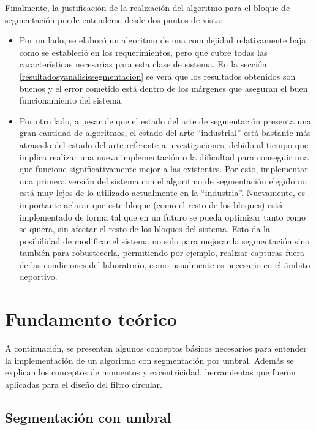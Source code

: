Finalmente, la justificación de la realización del algoritmo para el bloque de segmentación puede entenderse desde dos puntos de vista: 
\begin{itemize}
 \item Por un lado, se elaboró un algoritmo de una complejidad relativamente baja como se estableció en los requerimientos, pero que cubre todas las características necesarias para esta clase de sistema. En la sección \ref{resultadosyanalisissegmentacion} se verá que los resultados obtenidos son buenos y el error cometido está dentro de los márgenes que aseguran el buen funcionamiento del sistema.
 \item Por otro lado, a pesar de que el estado del arte de segmentación presenta una gran cantidad de algoritmos, el estado del arte ``industrial'' está bastante más atrasado del estado del arte referente a investigaciones, debido al tiempo que implica realizar una nueva implementación o la dificultad para conseguir una que funcione significativamente mejor a las existentes. Por esto, implementar una primera versión del sistema con el algoritmo de segmentación elegido no está muy lejos de lo utilizado actualmente en la ``industria''. Nuevamente, es importante aclarar que este bloque (como el resto de los bloques) está implementado de forma tal que en un futuro se pueda optimizar tanto como se quiera, sin afectar el resto de los bloques del sistema. Esto da la posibilidad de  modificar el sistema no solo para mejorar la segmentación sino también para robustecerla, permitiendo por ejemplo, realizar capturas fuera de las condiciones del laboratorio, como usualmente es necesario en el ámbito deportivo.
\end{itemize}


\section{Fundamento teórico}
\label{fundamentoteoseg}

A continuación, se presentan algunos conceptos básicos necesarios para entender la implementación de un algoritmo con segmentación por umbral. Además se explican los conceptos de momentos y excentricidad, herramientas que fueron aplicadas para el diseño del filtro circular.

\subsection{Segmentación con umbral}

